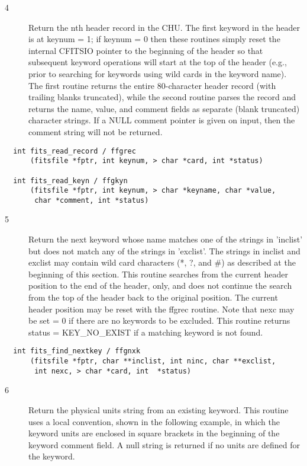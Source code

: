 \documentclass[11pt]{book}
\begin{document}
\begin{description}
\item[4 ] Return the nth header record in the CHU.  The first keyword
   in the header is at keynum = 1;  if keynum = 0 then these routines
   simply reset the internal CFITSIO pointer to the beginning of the header
   so that subsequent keyword operations will start at the top of the
   header (e.g., prior to searching for keywords using wild cards in
   the keyword name).   The first routine returns the entire
   80-character header record (with trailing blanks truncated),
   while the second routine parses the record and returns the name,
   value, and comment fields as separate (blank truncated)
   character strings.  If a NULL comment pointer is given on input,
   then the comment string will not be
  returned. \label{ffgrec} \label{ffgkyn}
\end{description}

\begin{verbatim}
  int fits_read_record / ffgrec
      (fitsfile *fptr, int keynum, > char *card, int *status)

  int fits_read_keyn / ffgkyn
      (fitsfile *fptr, int keynum, > char *keyname, char *value,
       char *comment, int *status)
\end{verbatim}

\begin{description}
\item[5 ] Return the next keyword whose name matches one of the strings in
    'inclist' but does not match any of the strings in 'exclist'.
    The strings in inclist and exclist may contain wild card characters
    (*, ?, and \#) as described at the beginning of this section.
    This routine searches from the current header position to the
    end of the header, only, and does not continue the search from
    the top of the header back to the original position.  The current
    header position may be reset with the ffgrec routine.  Note
    that nexc may be set = 0 if there are no keywords to be excluded.
    This routine returns status = KEY\_NO\_EXIST if a matching
   keyword is not found. \label{ffgnxk}
\end{description}

\begin{verbatim}
  int fits_find_nextkey / ffgnxk
      (fitsfile *fptr, char **inclist, int ninc, char **exclist,
       int nexc, > char *card, int  *status)
\end{verbatim}

\begin{description}
\item[6 ] Return the physical units string from an existing keyword.  This
    routine uses a local convention, shown in the following example,
    in which the keyword units are enclosed in square brackets in the
    beginning of the keyword comment field.  A null string is returned
   if no units are defined for the keyword.  \label{ffgunt}
\end{description}
\end{document}
